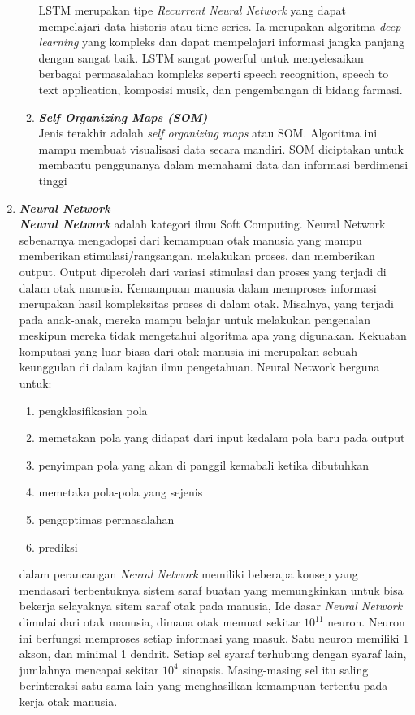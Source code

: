 \begin{enumerate}
\begin{enumerate}[nolistsep]
        LSTM merupakan tipe \textit{Recurrent Neural Network} yang dapat mempelajari data historis atau time series. Ia merupakan algoritma \textit{deep learning} yang kompleks dan dapat mempelajari informasi jangka panjang dengan sangat baik. LSTM sangat powerful untuk menyelesaikan berbagai permasalahan kompleks seperti speech recognition, speech to text application, komposisi musik, dan pengembangan di bidang farmasi.
      \item \textbf{\textit{Self Organizing Maps (SOM)}}\\
        Jenis terakhir adalah \textit{self organizing maps} atau SOM. Algoritma ini mampu membuat visualisasi data secara mandiri. SOM diciptakan untuk membantu penggunanya dalam memahami data dan informasi berdimensi tinggi
    \end{enumerate}
  \item \textbf{\textit{Neural Network}}\\
    \textbf{\textit{Neural Network}} adalah kategori ilmu Soft Computing. Neural Network sebenarnya mengadopsi dari kemampuan otak manusia yang   mampu memberikan stimulasi/rangsangan, melakukan proses, dan memberikan output. Output diperoleh dari variasi stimulasi dan proses yang terjadi di dalam otak manusia. Kemampuan manusia dalam memproses informasi merupakan hasil kompleksitas proses di dalam otak. Misalnya, yang terjadi pada anak-anak, mereka mampu belajar untuk melakukan pengenalan meskipun mereka tidak mengetahui algoritma apa yang digunakan. Kekuatan komputasi yang luar biasa dari otak manusia ini merupakan sebuah keunggulan di dalam kajian ilmu pengetahuan.
    Neural Network berguna untuk:
    \begin{enumerate}[nolistsep]
      \item pengklasifikasian pola
      \item memetakan pola yang didapat dari input kedalam pola baru pada output 
      \item penyimpan pola yang akan di panggil kemabali ketika dibutuhkan
      \item memetaka pola-pola yang sejenis
      \item pengoptimas permasalahan
      \item prediksi
    \end{enumerate}
    dalam perancangan \textit{Neural Network} memiliki beberapa konsep yang mendasari terbentuknya sistem saraf buatan yang memungkinkan untuk bisa bekerja selayaknya sitem saraf otak pada manusia, Ide dasar \textit{Neural Network} dimulai dari otak manusia, dimana otak memuat  sekitar $10^{11}$ neuron. Neuron ini berfungsi memproses setiap informasi yang masuk. Satu neuron memiliki 1 akson, dan minimal 1 dendrit. Setiap sel syaraf terhubung dengan syaraf lain, jumlahnya mencapai sekitar $10^{4}$ sinapsis. Masing-masing sel itu saling berinteraksi satu sama lain yang menghasilkan kemampuan tertentu pada kerja otak manusia. 

\end{enumerate}
